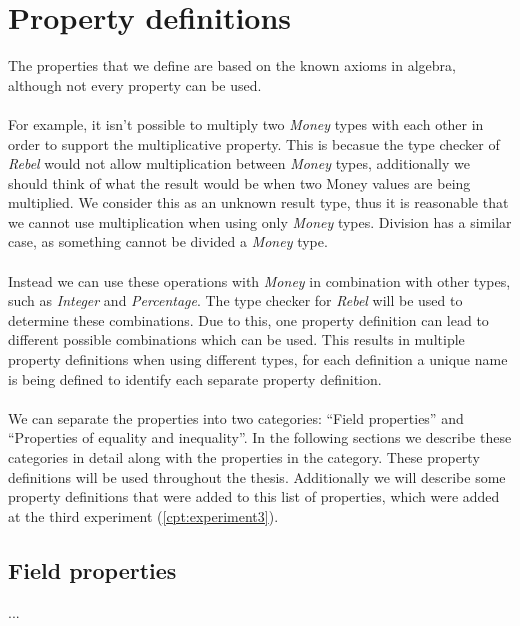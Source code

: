 \section{Property definitions}
\label{sct:properties_property_definitions}
The properties that we define are based on the known axioms in algebra, although
not every property can be used.\\
\\
For example, it isn't possible to multiply two
\textit{Money} types with each other in order to support the multiplicative
property. This is becasue the type checker of \textit{Rebel} would not allow
multiplication between \textit{Money} types, additionally we should think of
what the result would be when two Money values are being multiplied. We consider
this as an unknown result type, thus it is reasonable that we cannot use
multiplication when using only \textit{Money} types. Division has a similar
case, as something cannot be divided a \textit{Money} type.\\
\\
Instead we can use these operations with \textit{Money} in combination with
other types, such as \textit{Integer} and \textit{Percentage}. The type checker
for \textit{Rebel} will be used to determine these combinations. Due to this,
one property definition can lead to different possible combinations which can be
used. This results in multiple property definitions when using different types,
for each definition a unique name is being defined to identify each separate
property definition.\\
\\
We can separate the properties into two categories: ``Field properties'' and
``Properties of equality and inequality''. In the following sections we describe
these categories in detail along with the properties in the category. These
property definitions will be used throughout the thesis. Additionally we will
describe some property definitions that were added to this list of properties,
which were added at the third experiment (\autoref{cpt:experiment3}).

\subsection{Field properties}
\label{ssct:properties_definitions_fieldproperties}
...

